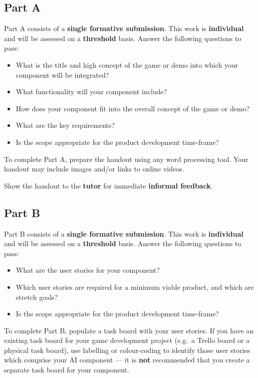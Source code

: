 \documentclass{../../fal_assignment}
\begin{document}
\subsection*{Part A}

Part A consists of a \textbf{single formative submission}. This work is \textbf{individual} and will be assessed on a \textbf{threshold} basis. Answer the following questions to pass:

\begin{itemize}
	\item What is the title and high concept of the game or demo into which your component will be integrated?
	\item What functionality will your component include?
	\item How does your component fit into the overall concept of the game or demo?
	\item What are the key requirements?
	\item Is the scope appropriate for the product development time-frame?
\end{itemize}

To complete Part A, prepare the handout using any word processing tool.
Your handout may include images and/or links to online videos.

Show the handout to the \textbf{tutor} for immediate \textbf{informal feedback}.

\subsection*{Part B}

Part B consists of a \textbf{single formative submission}. This work is \textbf{individual} and will be assessed on a \textbf{threshold} basis. Answer the following questions to pass:

\begin{itemize}
	\item What are the user stories for your component?
	\item Which user stories are required for a minimum viable product, and which are stretch goals?
	\item Is the scope appropriate for the product development time-frame?
\end{itemize}

To complete Part B, populate a task board with your user stories.
If you have an existing task board for your game development project (e.g.\ a Trello board or a physical task board),
use labelling or colour-coding to identify those user stories which comprise your AI component ---
it is \textbf{not} recommended that you create a separate task board for your component.
\end{document}
